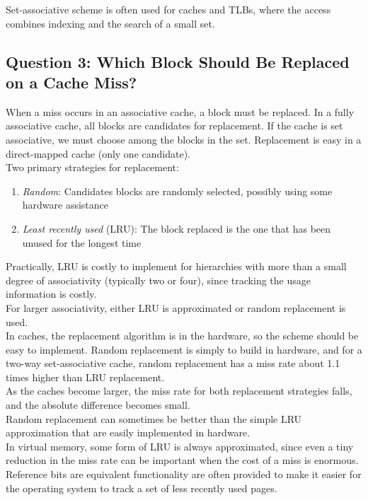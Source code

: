 \documentclass[12pt]{article}
\theoremstyle{definition}
\begin{document}
  Set-associative scheme is often used for caches and TLBs, where the access combines indexing and the search of a small set.

  \subsection{Question 3: Which Block Should Be Replaced on a Cache Miss?}
  When a miss occurs in an associative cache, a block must be replaced.
  In a fully associative cache, all blocks are candidates for replacement.
  If the cache is set associative, we must choose among the blocks in the set.
  Replacement is easy in a direct-mapped cache (only one candidate). \\

  Two primary strategies for replacement:
  \begin{enumerate}
    \item \emph{Random}: Candidates blocks are randomly selected, possibly using some hardware assistance
    \item \emph{Least recently used} (LRU): The block replaced is the one that has been unused for the longest time
  \end{enumerate}
  Practically, LRU is costly to implement for hierarchies with more than a small degree of associativity (typically two or four), since tracking the usage information is costly. \\

  For larger associativity, either LRU is approximated or random replacement is used. \\
  In caches, the replacement algorithm is in the hardware, so the scheme should be easy to implement.
  Random replacement is simply to build in hardware, and for a two-way set-associative cache, random replacement has a miss rate about 1.1 times higher than LRU replacement. \\
  As the caches become larger, the miss rate for both replacement strategies falls, and the absolute difference becomes small. \\
  Random replacement can sometimes be better than the simple LRU approximation that are easily implemented in hardware. \\

  In virtual memory, some form of LRU is always approximated, since even a tiny reduction in the miss rate can be important when the cost of a miss is enormous. \\
  Reference bits are equivalent functionality are often provided to make it easier for the operating system to track a set of less recently used pages.
\end{document}
